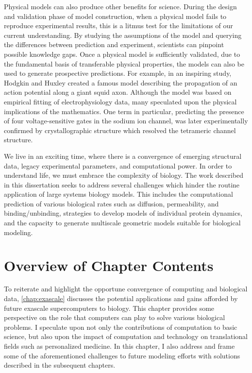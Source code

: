 \par Physical models can also produce other benefits for science.
During the design and validation phase of model construction, when a physical model fails to reproduce experimental results, this is a litmus test for the limitations of our current understanding.
By studying the assumptions of the model and querying the differences between prediction and experiment, scientists can pinpoint possible knowledge gaps.
Once a physical model is sufficiently validated, due to the fundamental basis of transferable physical properties, the models can also be used to generate prospective predictions.
For example, in an inspiring study, Hodgkin and Huxley created a famous model describing the propagation of an action potential along a giant squid axon\cite{HUXLEY1952}.
Although the model was based on empirical fitting of electrophysiology data, many speculated upon the physical implications of the mathematics.
One term in particular, predicting the presence of four voltage-sensitive gates in the sodium ion channel, was later experimentally confirmed by crystallographic structure which resolved the tetrameric channel structure\cite{Sigg2014a}.

\par We live in an exciting time, where there is a convergence of emerging structural data, legacy experimental parameters, and computational power.
In order to understand life, we must embrace the complexity of biology.
The work described in this dissertation seeks to address several challenges which hinder the routine application of large systems biology models.
This includes the computational prediction of various biological rates such as diffusion, permeability, and binding/unbinding, strategies to develop models of individual protein dynamics, and the capacity to generate multiscale geometric models suitable for biological modeling.

\section{Overview of Chapter Contents}

\par To reiterate and highlight the opportune convergence of computing and biological data, \cref{chap:exascale} discusses the potential applications and gains afforded by future exascale supercomputers to biology.
This chapter provides some perspective on the role that computers can play to solve various biological problems.
I speculate upon not only the contributions of computation to basic science, but also upon the impact of computation and technology on translational fields such as personalized medicine.
In this chapter, I also address and frame some of the aforementioned challenges to future modeling efforts with solutions described in the subsequent chapters.

